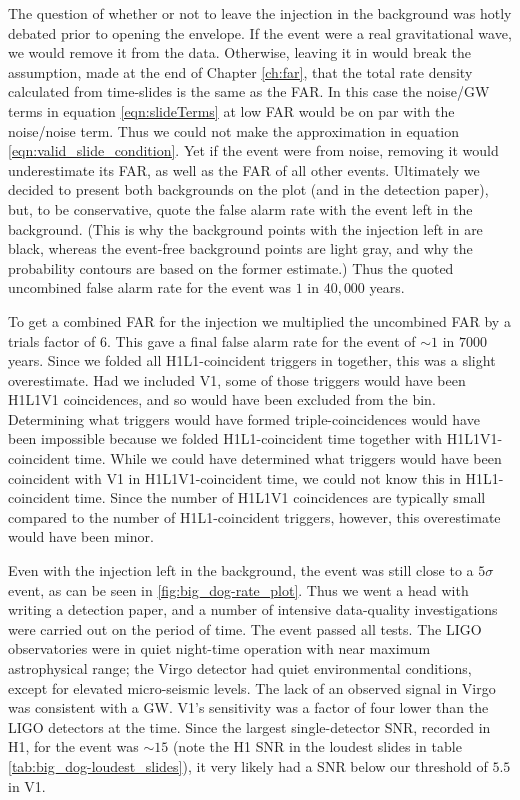 The question of whether or not to leave the injection in the background was
hotly debated prior to opening the envelope. If the event were a real
gravitational wave, we would remove it from the data. Otherwise, leaving it in
would break the assumption, made at the end of Chapter \ref{ch:far}, that the
total rate density calculated from time-slides is the same as the \ac{FAR}. In
this case the noise/GW terms in equation \ref{eqn:slideTerms} at low
\ac{FAR} would be on par with the noise/noise term. Thus we could not make the
approximation in equation \ref{eqn:valid_slide_condition}. Yet if the event
were from noise, removing it would underestimate its \ac{FAR}, as well as the
\ac{FAR} of all other events. Ultimately we decided to present both backgrounds
on the plot (and in the detection paper), but, to be conservative, quote the
false alarm rate with the event left in the background. (This is why the
background points with the injection left in are black, whereas the event-free
background points are light gray, and why the probability contours are based on
the former estimate.) Thus the quoted uncombined false alarm rate for the event
was $1$ in $40,000$ years.

To get a combined \ac{FAR} for the injection we multiplied the uncombined
\ac{FAR} by a trials factor of 6. This gave a final false alarm rate for the
event of $\sim1$ in $7000$ years. Since we folded all H1L1-coincident triggers
in together, this was a slight overestimate. Had we included V1, some of those
triggers would have been H1L1V1 coincidences, and so would have been excluded
from the bin. Determining what triggers would have formed triple-coincidences
would have been impossible because we folded H1L1-coincident time together with
H1L1V1-coincident time. While we could have determined what triggers would have
been coincident with V1 in H1L1V1-coincident time, we could not know this in
H1L1-coincident time. Since the number of H1L1V1 coincidences are typically
small compared to the number of H1L1-coincident triggers, however, this
overestimate would have been minor.

Even with the injection left in the background, the event was still close
to a $5\sigma$ event, as can be seen in \ref{fig:big_dog-rate_plot}. Thus we
went a head with writing a detection paper, and a number of intensive
data-quality investigations were carried out on the period of time. The event
passed all tests.  The LIGO observatories were in quiet night-time operation
with near maximum astrophysical range; the Virgo detector had quiet
environmental conditions, except for elevated micro-seismic levels. The lack of
an observed signal in Virgo was consistent with a \ac{GW}. V1's sensitivity was
a factor of four lower than the LIGO detectors at the time. Since the largest
single-detector \ac{SNR}, recorded in H1, for the event was $\sim15$ (note the
H1 \ac{SNR} in the loudest slides in table \ref{tab:big_dog-loudest_slides}),
it very likely had a \ac{SNR} below our threshold of $5.5$ in V1.

